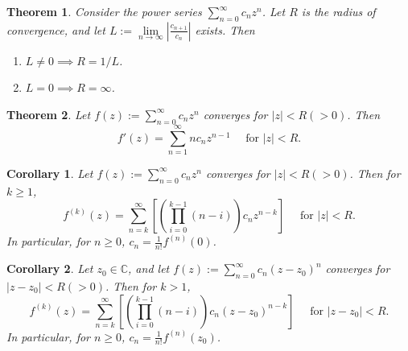 \documentclass[12pt,openany]{book}
\newtheorem{theorem}{Theorem}[chapter]
\newtheorem{corollary}{Corollary}[theorem]
\theoremstyle{definition}
\newcommand{\C}{\mathbb{C}}
\newcommand{\of}[1]{\left( #1 \right)}
\newcommand{\abs}[1]{\left\lvert #1 \right\rvert}
\begin{document}
	\vspace{8pt}
	\begin{tcolorbox}[colback=white,colframe=thmcolor,arc=5pt,title={\color{white}\bf }]
		\begin{theorem}
			Consider the power series $\sum_{n=0}^\infty c_nz^n$. Let $R$ is the radius of convergence, and let $L:=\lim\limits_{n\to\infty}\abs{\frac{c_{n+1}}{c_n}}$ exists. Then \begin{enumerate}[(1)]
				\item $L\neq 0\implies R=1/L$.
				\item $L=0\implies R=\infty$.
			\end{enumerate}
		\end{theorem}
	\end{tcolorbox}
	\vspace{8pt}
	\begin{tcolorbox}[colback=white,colframe=thmcolor,arc=5pt,title={\color{white}\bf }]
		\begin{theorem}
			Let $f(z):=\sum_{n=0}^\infty c_nz^n$ converges for $\abs{z}<R(>0)$. Then \[
			f'(z)=\sum_{n=1}^\infty nc_nz^{n-1}\quad\text{ for $\abs{z}<R$.}
			\]
		\end{theorem}
	\end{tcolorbox}
	\vspace{4pt}
	\begin{tcolorbox}[colback=white,colframe=corcolor,arc=5pt,title={\color{white}\bf }]
		\begin{corollary}
			Let $f(z):=\sum_{n=0}^\infty c_nz^n$ converges for $\abs{z}<R(>0)$. Then for $k\geq 1$, \[
			f^{(k)}(z)=\sum_{n=k}^\infty\left[\of{\prod_{i=0}^{k-1}(n-i)}c_nz^{n-k}\right]\quad\text{ for $\abs{z}<R$.}
			\] In particular, for $n\geq 0$, $c_n=\displaystyle\frac{1}{n!}f^{(n)}(0)$.
		\end{corollary}
	\end{tcolorbox}
	\vspace{4pt}
	\begin{tcolorbox}[colback=white,colframe=corcolor,arc=5pt,title={\color{white}\bf }]
	\begin{corollary}
		Let $z_0\in\C$, and let $f(z):=\sum_{n=0}^\infty c_n\of{z-z_0}^n$ converges for $\abs{z-z_0}<R(>0)$. Then for $k>1$, \[
		f^{(k)}(z)=\sum_{n=k}^\infty\left[\of{\prod_{i=0}^{k-1}(n-i)}c_n\of{z-z_0}^{n-k}\right]\quad\text{ for $\abs{z-z_0}<R$.}
		\] In particular, for $n\geq 0$, $c_n=\displaystyle\frac{1}{n!}f^{(n)}(z_0)$.
	\end{corollary}
	\end{tcolorbox}
\end{document}
